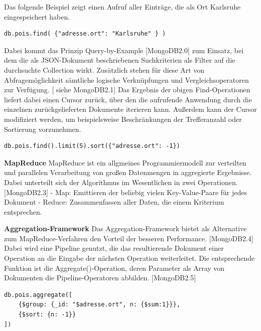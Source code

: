 Das folgende Beispiel zeigt einen Aufruf aller Einträge, die als Ort Karlsruhe eingespeichert haben. 
\newline
\begin{lstlisting}[caption=MongoDB Read, label=lst:MongoDBRead]
db.pois.find( {"adresse.ort": "Karlsruhe" } )
\end{lstlisting}

Dabei kommt das Prinzip Query-by-Example [MongoDB2.0] zum Einsatz, bei dem die als JSON-Dokument beschriebenen Suchkriterien als Filter auf die durchsuchte Collection wirkt. Zusätzlich stehen für diese Art von Abfragemöglichkeit sämtliche logische Verknüpfungen und Vergleichsoperatoren zur Verfügung.  [ siehe MongoDB2.1]
Das Ergebnis der obigen Find-Operationen liefert dabei einen Cursor zurück, über den die aufrufende Anwendung durch die einzelnen zurückgelieferten Dokumente iterieren kann. Außerdem kann der Cursor modifiziert werden, um beispielsweise Beschränkungen der Trefferanzahl oder Sortierung vorzunehmen.
\newline
\begin{lstlisting}[caption=MongoDB Read Modifikation, label=lst:MongoDBReadModifikation]
db.pois.find().limit(5).sort({"adresse.ort": -1})
\end{lstlisting}


\textbf{MapReduce}
\newline
MapReduce ist ein allgmeines Programmiermodell zur verteilten und parallelen Verarbeitung von großen Datenmengen in aggregierte Ergebnisse. Dabei unterteilt sich der Algorithmus im Wesentlichen in zwei Operationen. [MongoDB2.3]
\newline
-	Map: Emittieren der beliebig vielen Key-Value-Paare für jedes Dokument
\newline
-	Reduce: Zusammenfassen aller Daten, die einem Kriterium entsprechen.
\newline

\textbf{Aggregation-Framework}
\newline
Das Aggregation-Framework bietet als Alternative zum MapReduce-Verfahren den Vorteil der besseren Performance. [MongoDB2.4] Dabei wird eine Pipeline genutzt, die das resultierende Dokument einer Operation an die Eingabe der nächsten Operation weiterleitet. Die entsprechende Funktion ist die Aggregate()-Operation, deren Parameter als Array von Dokumenten die Pipeline-Operatoren abbilden. [MongoDB2.5]
\newline 

\begin{lstlisting}[caption=MongoDB Aggregate, label=lst:MongoDBAggregate]
db.pois.aggregate([
    {$group: {_id: "$adresse.ort", n: {$sum:1}}},
    {$sort: {n: -1}}
])
\end{lstlisting}


